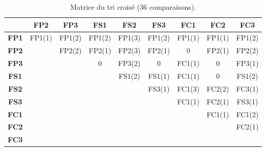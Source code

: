 \documentclass{report}
\begin{document}
\begin{table}[H]
\centering
{\small
\setlength{\tabcolsep}{3pt}
\renewcommand{\arraystretch}{1.3}
\begin{tabular}{|c|c|c|c|c|c|c|c|c|}
\hline
\cellcolor{gray!15} & \cellcolor{whybg}\textbf{FP2} & \cellcolor{whybg}\textbf{FP3} & \cellcolor{whatbg}\textbf{FS1} & \cellcolor{whatbg}\textbf{FS2} & \cellcolor{whatbg}\textbf{FS3} & \cellcolor{defibg}\textbf{FC1} & \cellcolor{defibg}\textbf{FC2} & \cellcolor{defibg}\textbf{FC3} \\ \hline
\cellcolor{whybg}\textbf{FP1} & \cellcolor{whybg}FP1(1) & \cellcolor{whybg}FP1(2) & \cellcolor{whybg}FP1(2) & \cellcolor{whybg}FP1(3) & \cellcolor{whybg}FP1(2) & \cellcolor{whybg}FP1(1) & \cellcolor{whybg}FP1(1) & \cellcolor{whybg}FP1(2) \\ \hline
\cellcolor{whybg}\textbf{FP2} & \cellcolor{gray!35} & \cellcolor{whybg}FP2(2) & \cellcolor{whybg}FP2(1) & \cellcolor{whybg}FP2(3) & \cellcolor{whybg}FP2(1) & \cellcolor{gray!10}0 & \cellcolor{whybg}FP2(1) & \cellcolor{whybg}FP2(2) \\ \hline
\cellcolor{whybg}\textbf{FP3} & \cellcolor{gray!35} & \cellcolor{gray!35} & \cellcolor{gray!10}0 & \cellcolor{whybg}FP3(2) & \cellcolor{gray!10}0 & \cellcolor{defibg}FC1(1) & \cellcolor{gray!10}0 & \cellcolor{whybg}FP3(1) \\ \hline
\cellcolor{whatbg}\textbf{FS1} & \cellcolor{gray!35} & \cellcolor{gray!35} & \cellcolor{gray!35} & \cellcolor{whatbg}FS1(2) & \cellcolor{whatbg}FS1(1) & \cellcolor{defibg}FC1(1) & \cellcolor{gray!10}0 & \cellcolor{whatbg}FS1(2) \\ \hline
\cellcolor{whatbg}\textbf{FS2} & \cellcolor{gray!35} & \cellcolor{gray!35} & \cellcolor{gray!35} & \cellcolor{gray!35} & \cellcolor{whatbg}FS3(1) & \cellcolor{defibg}FC1(3) & \cellcolor{defibg}FC2(2) & \cellcolor{defibg}FC3(1) \\ \hline
\cellcolor{whatbg}\textbf{FS3} & \cellcolor{gray!35} & \cellcolor{gray!35} & \cellcolor{gray!35} & \cellcolor{gray!35} & \cellcolor{gray!35} & \cellcolor{defibg}FC1(1) & \cellcolor{defibg}FC2(1) & \cellcolor{whatbg}FS3(1) \\ \hline
\cellcolor{defibg}\textbf{FC1} & \cellcolor{gray!35} & \cellcolor{gray!35} & \cellcolor{gray!35} & \cellcolor{gray!35} & \cellcolor{gray!35} & \cellcolor{gray!35} & \cellcolor{defibg}FC1(1) & \cellcolor{defibg}FC1(2) \\ \hline
\cellcolor{defibg}\textbf{FC2} & \cellcolor{gray!35} & \cellcolor{gray!35} & \cellcolor{gray!35} & \cellcolor{gray!35} & \cellcolor{gray!35} & \cellcolor{gray!35} & \cellcolor{gray!35} & \cellcolor{defibg}FC2(1) \\ \hline
\cellcolor{defibg}\textbf{FC3} & \cellcolor{gray!35} & \cellcolor{gray!35} & \cellcolor{gray!35} & \cellcolor{gray!35} & \cellcolor{gray!35} & \cellcolor{gray!35} & \cellcolor{gray!35} & \cellcolor{gray!35} \\ \hline
\end{tabular}}
\caption{Matrice du tri croisé (36 comparaisons).}
\label{tab:tri}
\end{table}
\end{document}
